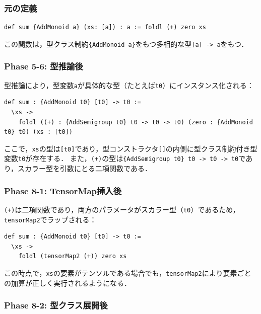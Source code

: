 \subsubsection{元の定義}

\begin{lstlisting}[language=egison,numbers=none]
def sum {AddMonoid a} (xs: [a]) : a := foldl (+) zero xs
\end{lstlisting}

この関数は，型クラス制約\lstinline|{AddMonoid a}|をもつ多相的な型\lstinline{[a] -> a}をもつ．

\subsubsection{Phase 5-6: 型推論後}

型推論により，型変数\lstinline{a}が具体的な型（たとえば\lstinline{t0}）にインスタンス化される：

\begin{lstlisting}[language=egison,numbers=none]
def sum : {AddMonoid t0} [t0] -> t0 :=
  \xs ->
    foldl ((+) : {AddSemigroup t0} t0 -> t0 -> t0) (zero : {AddMonoid t0} t0) (xs : [t0])
\end{lstlisting}

ここで，\lstinline{xs}の型は\lstinline{[t0]}であり，型コンストラクタ\lstinline{[]}の内側に型クラス制約付き型変数\lstinline{t0}が存在する．
また，\lstinline{(+)}の型は\lstinline|{AddSemigroup t0} t0 -> t0 -> t0|であり，スカラー型を引数にとる二項関数である．

\subsubsection{Phase 8-1: TensorMap挿入後}

\lstinline{(+)}は二項関数であり，両方のパラメータがスカラー型（\lstinline{t0}）であるため，\lstinline{tensorMap2}でラップされる：

\begin{lstlisting}[language=egison,numbers=none]
def sum : {AddMonoid t0} [t0] -> t0 :=
  \xs ->
    foldl (tensorMap2 (+)) zero xs
\end{lstlisting}

この時点で，\lstinline{xs}の要素がテンソルである場合でも，\lstinline{tensorMap2}により要素ごとの加算が正しく実行されるようになる．

\subsubsection{Phase 8-2: 型クラス展開後}

